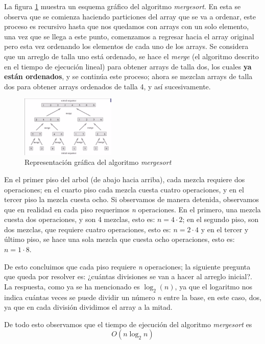 \documentclass[letterpaper, 12pt]{article}
\begin{document}
La figura \ref{fig:merge_sort} muestra un esquema gráfico del algoritmo \emph{mergesort}.
En esta se observa que se comienza haciendo particiones del array que se va a
ordenar, este proceso es recursivo hasta que nos quedamos con arrays con un solo
elemento, una vez que se llega a este punto, comenzamos a regresar hacia el
array original pero esta vez ordenando los elementos de cada uno de los arrays.
Se considera que un arreglo de talla uno está ordenado, se hace el \emph{merge}
(el algoritmo descrito en el tiempo de ejecución lineal)  para obtener arrays de
talla dos, los cuales \textbf{ya están ordenados}, y se continúa este proceso; ahora se
mezclan arrays de talla dos para obtener arrays ordenados de talla 4, y así
sucesivamente.

\begin{figure}[htbp!]
\centering
\includegraphics[keepaspectratio,width=0.4\textwidth]{./img/merge_sort.png}
\caption{\label{fig:merge_sort}Representación gráfica del algoritmo \emph{mergesort}}
\end{figure}

En el primer piso del arbol (de abajo hacia arriba), cada mezcla requiere dos
operaciones; en el cuarto piso cada mezcla cuesta cuatro operaciones, y en el
tercer piso la mezcla cuesta ocho. Si observamos de manera detenida, observamos
que en realidad en cada piso requerimos \emph{n} operaciones. En el primero, una
mezcla cuesta dos operaciones, y son 4 mezclas, esto es: \(n = 4 \cdot 2\); en el
segundo piso, son dos mezclas, que requiere cuatro operaciones, esto es:
\(n = 2 \cdot 4\) y en el tercer y último piso, se hace una sola mezcla que cuesta
ocho operaciones, esto es: \(n = 1 \cdot 8\).

De esto concluimos que cada piso requiere \emph{n} operaciones; la siguiente pregunta
que queda por resolver es: ¿cuántas divisiones se van a hacer al arreglo
inicial?. La respuesta, como ya se ha mencionado es \(\log_2(n)\), ya que el
logaritmo nos indica cuántas veces se puede dividir un número \emph{n} entre la base,
en este caso, dos, ya que en cada división dividimos el array a la mitad.

De todo esto observamos que el tiempo de ejecución del algoritmo \emph{mergesort} es
$$
O(n \log_2 n)
$$
\end{document}
